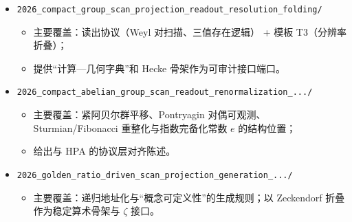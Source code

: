 \begin{itemize}
  \item \texttt{2026\_compact\_group\_scan\_projection\_readout\_resolution\_folding/}
  \begin{itemize}
    \item 主要覆盖：读出协议（Weyl 对扫描、三值存在逻辑） + 模板 T3（分辨率折叠）；
    \item 提供“计算—几何字典”和 Hecke 骨架作为可审计接口端口。
  \end{itemize}

  \item \texttt{2026\_compact\_abelian\_group\_scan\_readout\_renormalization\_.../}
  \begin{itemize}
    \item 主要覆盖：紧阿贝尔群平移、Pontryagin 对偶可观测、Sturmian/Fibonacci 重整化与指数完备化常数 $e$ 的结构位置；
    \item 给出与 HPA 的协议层对齐陈述。
  \end{itemize}

  \item \texttt{2026\_golden\_ratio\_driven\_scan\_projection\_generation\_.../}
  \begin{itemize}
    \item 主要覆盖：递归地址化与“概念可定义性”的生成规则；以 Zeckendorf 折叠作为稳定算术骨架与 $\zeta$ 接口。
  \end{itemize}
\end{itemize}

